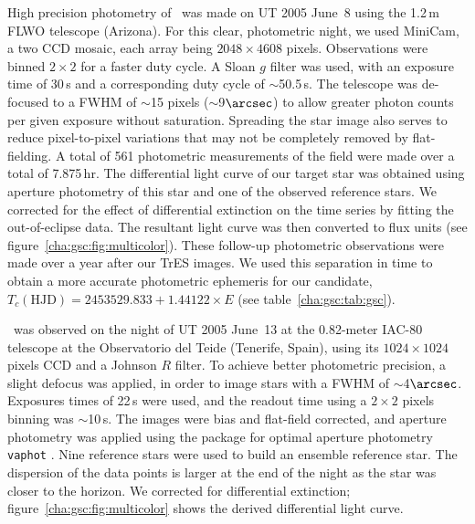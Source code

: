 High precision photometry of \gscOTE\ was made on UT 2005 June~8 using
the 1.2\,m FLWO telescope (Arizona).  For this clear, photometric
night, we used MiniCam, a two CCD mosaic, each array being $2048
\times 4608$ pixels.  Observations were binned $2\times2$ for a faster
duty cycle. A Sloan $g$ filter was used, with an exposure time of
30\,s and a corresponding duty cycle of $\sim$50.5\,s.  The telescope
was de-focused to a FWHM of $\sim$15 pixels ($\sim$9$\arcsec$) to
allow greater photon counts per given exposure without saturation.
Spreading the star image also serves to reduce pixel-to-pixel
variations that may not be completely removed by flat-fielding. A
total of 561 photometric measurements of the field were made over a
total of 7.875\,hr. The differential light curve of our target star
was obtained using aperture photometry of this star and one of the
observed reference stars. We corrected for the effect of differential
extinction on the time series by fitting the out-of-eclipse
data. The resultant light curve was then converted to flux units (see
figure~\ref{cha:gsc:fig:multicolor}). These follow-up photometric
observations were made over a year after our TrES images. We used this
separation in time to obtain a more accurate photometric ephemeris for
our candidate, $T_{c} (\mathrm{HJD}) = 2453529.833 + 1.44122 \times E$
(see table~\ref{cha:gsc:tab:gsc}).

\gscOTE\ was observed on the night of UT 2005 June~13 at the 0.82-meter
IAC-80 telescope at the Observatorio del Teide (Tenerife, Spain),
using its $1024 \times 1024$ pixels CCD and a Johnson $R$ filter. To
achieve better photometric precision, a slight defocus was applied, in order to image stars with a FWHM of $\sim$4$\arcsec$.  Exposures times of
22\,s were used, and the readout time using a $2 \times 2$ pixels binning was
$\sim$10\,s. The images were bias and flat-field corrected, and
aperture photometry was applied using the package for optimal aperture
photometry \texttt{vaphot} \citep{Deeg_Doyle:2001a}. Nine reference
stars were used to build an ensemble reference star. The dispersion of
the data points is larger at the end of the night as the star was
closer to the horizon. We corrected for differential extinction;
figure~\ref{cha:gsc:fig:multicolor} shows the derived differential light
curve.

